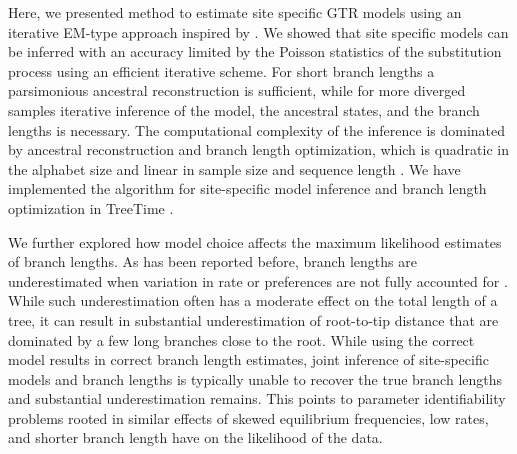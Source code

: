 \documentclass[aps,rmp,twocolumn]{revtex4}
\begin{document}
Here, we presented method to estimate site specific GTR models using an iterative EM-type approach inspired by \citet{bruno1996modeling}.
We showed that site specific models can be inferred with an accuracy limited by the Poisson statistics of the substitution process using an efficient iterative scheme.
For short branch lengths a parsimonious ancestral reconstruction is sufficient, while for more diverged samples iterative inference of the model, the ancestral states, and the branch lengths is necessary.
The computational complexity of the inference is dominated by ancestral reconstruction and branch length optimization, which is quadratic in the alphabet size and linear in sample size and sequence length \citep{felsenstein2004inferring}.
We have implemented the algorithm for site-specific model inference and branch length optimization in TreeTime \citep{sagulenko2017treetime}.


We further explored how model choice affects the maximum likelihood estimates of branch lengths.
As has been reported before, branch lengths are underestimated when variation in rate or preferences are not fully accounted for \citep{halpern_evolutionary_1998,hilton_modeling_2018}.
While such underestimation often has a moderate effect on the total length of a tree, it can result in substantial underestimation of root-to-tip distance that are dominated by a few long branches close to the root.
While using the correct model results in correct branch length estimates, joint inference of site-specific models and branch lengths is typically unable to recover the true branch lengths and substantial underestimation remains.
This points to parameter identifiability problems rooted in similar effects of skewed equilibrium frequencies, low rates, and shorter branch length have on the likelihood of the data.
\end{document}
